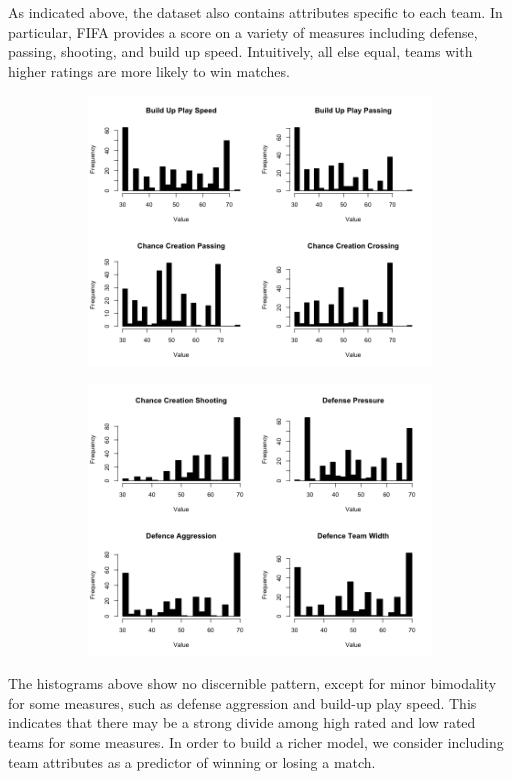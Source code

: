 \documentclass{article}
\begin{document}
As indicated above, the dataset also contains attributes specific to each team. In particular, FIFA provides a score on a variety of measures including defense, passing, shooting, and build up speed. Intuitively, all else equal, teams with higher ratings are more likely to win matches. \\

\begin{figure}[H]
\centering
\begin{subfigure}{.5\textwidth}
  \centering
  \includegraphics[width=.8\linewidth]{figures/hist1.png}
  \label{fig:sub1}
\end{subfigure}%
\begin{subfigure}{.5\textwidth}
  \centering
  \includegraphics[width=.8\linewidth]{figures/hist2.png}
  \label{fig:sub2}
\end{subfigure}
\end{figure}

The histograms above show no discernible pattern, except for minor bimodality for some measures, such as defense aggression and build-up play speed. This indicates that there may be a strong divide among high rated and low rated teams for some measures. In order to build a richer model, we consider including team attributes as a predictor of winning or losing a match.\\
\end{document}
